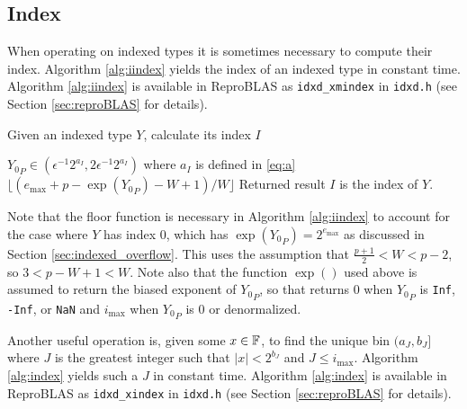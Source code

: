   \subsection{Index}
    \label{sec:primitiveops_index}
    When operating on indexed types it is sometimes necessary to compute their
    index. Algorithm \ref{alg:iindex} yields the index of an indexed type in
    constant time. Algorithm \ref{alg:iindex} is available in ReproBLAS as \texttt{idxd\_xmindex} in \texttt{idxd.h} (see Section \ref{sec:reproBLAS} for details).

    \begin{samepage}
    \begin{alg}
      Given an indexed type $Y$, calculate its index $I$
      \begin{algorithmic}[1]
        \Require
          \Statex ${Y_0}_P \in (\epsilon^{-1}  2^{a_{I}}, 2  \epsilon^{-1}  2^{a_I})$
          where $a_I$ is defined in \eqref{eq:a}
          \State \Return $\lfloor(e_{\max} + p - \exp({Y_0}_P) - W + 1)/W\rfloor$
        \EndFunction
        \Ensure
          \Statex Returned result $I$ is the index of $Y$.
      \end{algorithmic}
      \label{alg:iindex}
    \end{alg}
    \end{samepage}

    Note that the floor function is necessary in Algorithm \ref{alg:iindex} to
    account for the case where $Y$ has index $0$, which has $\exp({Y_0}_P) =
    2^{e_{\max}}$ as discussed in Section \ref{sec:indexed_overflow}.  This
    uses the assumption that $\frac{p+1}{2} < W < p-2$, so $3 < p - W + 1 < W.$ 
    Note also that the function $\exp()$ used above is assumed to return the biased exponent of ${Y_0}_P$, so that  returns 0 when ${Y_0}_P$ is \texttt{Inf}, \texttt{-Inf}, or \texttt{NaN} and $i_{\max}$ when ${Y_0}_P$ is 0 or denormalized.

    Another useful operation is, given some $x \in \mathbb{F}$, to find the unique bin
    $(a_J, b_J]$ where $J$ is the greatest integer such that $|x| < 2^{b_J}$ and $J \leq i_{\max}$.
    Algorithm \ref{alg:index} yields such a $J$ in constant time. Algorithm \ref{alg:index} is available in ReproBLAS as \texttt{idxd\_xindex} in \texttt{idxd.h} (see Section \ref{sec:reproBLAS} for details).


